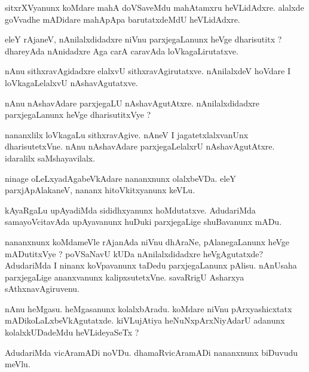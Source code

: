 \documentclass{article}
\begin{document}
\begin{mn}
sitxrXVyanunx koMdare mahA doVSaveMdu mahAtamxru heVLidAdxre. alalxde goVvadhe 
mADidare mahApApa barutatxdeMdU heVLidAdxre. 
\end{mn}

\begin{mn}
eleY rAjaneV, nAnilalxdidadxre niVnu parxjegaLanunx heVge dharisutitx ? 
dhareyAda nAnidadxre Aga carA caravAda loVkagaLirutatxve.
\end{mn}

\begin{mn}
nAnu sithxravAgidadxre elalxvU sithxravAgirutatxve.  nAnilalxdeV hoVdare 
I loVkagaLelalxvU nAshavAgutatxve. 
\end{mn}

\begin{mn}
nAnu nAshavAdare parxjegaLU nAshavAgutAtxre. nAnilalxdidadxre parxjegaLanunx heVge dharisutitxVye ?
\end{mn}

\begin{mn}
nananxlilx loVkagaLu sithxravAgive.  nAneV I jagatetxlalxvanUnx dharisutetxVne. 
nAnu nAshavAdare  parxjegaLelalxrU nAshavAgutAtxre.  idaralilx saMshayavilalx.
\end{mn}

\begin{mn}
ninage oLeLxyadAgabeVkAdare nananxnunx olalxbeVDa. eleY parxjApAlakaneV, nananx hitoVkitxyanunx keVLu.
\end{mn}

\begin{mn}
kAyaRgaLu upAyadiMda sididhxyanunx hoMdutatxve.  AdudariMda samayoVcitavAda 
upAyavanunx huDuki parxjegaLige shuBavanunx mADu.
\end{mn}

\begin{mn}
nananxnunx koMdameVle rAjanAda niVnu dhAraNe, pAlanegaLanunx heVge mADutitxVye ?  
poVSaNavU kUDa nAnilalxdidadxre heVgAgutatxde? AdudariMda I ninanx koVpavanunx 
taDedu parxjegaLanunx pAlisu.  nAnUsaha parxjegaLige ananxvanunx kalipxsutetxVne. 
savaRrigU Asharxya sAthxnavAgiruvenu. 
\end{mn}

\begin{mn}
nAnu heMgasu. heMgasanunx kolalxbAradu.  koMdare niVnu pArxyashicxtatx mADikoLaLxbeVkAgutatxde.  
kiVLujAtiya heNuNxpArxNiyAdarU adanunx kolalxkUDadeMdu heVLideyaSeTx ?
\end{mn}

\begin{mn}
AdudariMda vicAramADi noVDu.  dhamaRvicAramADi nananxnunx biDuvudu meVlu.
\end{mn}
\end{document}
